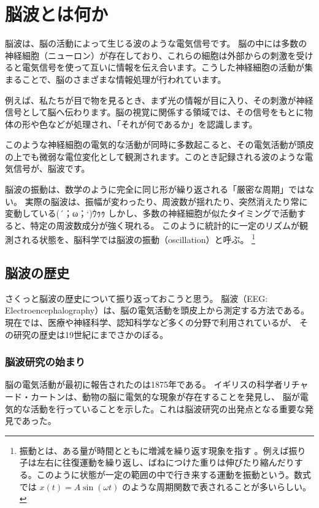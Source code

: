\chapter{脳波とは何か}

脳波は、脳の活動によって生じる波のような電気信号です。
脳の中には多数の神経細胞（ニューロン）が存在しており、これらの細胞は外部からの刺激を受けると電気信号を使って互いに情報を伝え合います。こうした神経細胞の活動が集まることで、脳のさまざまな情報処理が行われています。

例えば、私たちが目で物を見るとき、まず光の情報が目に入り、その刺激が神経信号として脳へ伝わります。脳の視覚に関係する領域では、その信号をもとに物体の形や色などが処理され、「それが何であるか」を認識します。

このような神経細胞の電気的な活動が同時に多数起こると、その電気活動が頭皮の上でも微弱な電位変化として観測されます。このとき記録される波のような電気信号が、脳波です。

脳波の振動は、数学のように完全に同じ形が繰り返される「厳密な周期」ではない。
実際の脳波は、振幅が変わったり、周波数が揺れたり、突然消えたり常に変動している(´；ω；`)ｳｩｩ
しかし、多数の神経細胞が似たタイミングで活動すると、特定の周波数成分が強く現れる。
このように統計的に一定のリズムが観測される状態を、脳科学では脳波の振動（oscillation）と呼ぶ。
\footnote{振動とは、ある量が時間とともに増減を繰り返す現象を指す 。例えば振り子は左右に往復運動を繰り返し、ばねにつけた重りは伸びたり縮んだりする。このように状態が一定の範囲の中で行き来する運動を振動という。数式では $x(t)=A\sin(\omega t)$ のような周期関数で表されることが多いらしい。}

\section{脳波の歴史}
さくっと脳波の歴史について振り返っておこうと思う。
脳波（EEG: Electroencephalography）は、脳の電気活動を頭皮上から測定する方法である。
現在では、医療や神経科学、認知科学など多くの分野で利用されているが、
その研究の歴史は19世紀にまでさかのぼる。

\subsection{脳波研究の始まり}

脳の電気活動が最初に報告されたのは1875年である。
イギリスの科学者リチャード・カートンは、動物の脳に電気的な現象が存在することを発見し、
脳が電気的な活動を行っていることを示した。これは脳波研究の出発点となる重要な発見であった。


